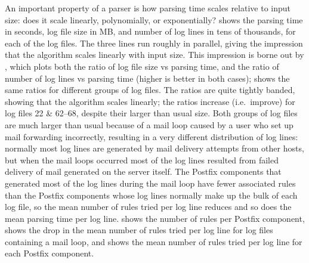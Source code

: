 An important property of a parser is how parsing time scales relative to
input size: does it scale linearly, polynomially, or exponentially?
 shows
the parsing time in seconds, log file size in MB, and number of log lines
in tens of thousands, for each of the \numberOFlogFILES{} log files.  The
three lines run roughly in parallel, giving the impression that the
algorithm scales linearly with input size.  This impression is borne out by
,
which plots both the ratio of log file size vs parsing time, and the ratio
of number of log lines vs parsing time (higher is better in both cases);
 shows the same ratios for different groups of log files.  The ratios
are quite tightly banded, showing that the algorithm scales linearly; the
ratios increase (i.e.\ improve) for log files 22 \& 62--68, despite their
larger than usual size.  Both groups of log files are much larger than
usual because of a mail loop caused by a user who set up mail forwarding
incorrectly, resulting in a very different distribution of log lines:
normally most log lines are generated by mail delivery attempts from other
hosts, but when the mail loops occurred most of the log lines resulted from
failed delivery of mail generated on the server itself.  The Postfix
components that generated most of the log lines during the mail loop have
fewer associated rules than the Postfix components whose log lines normally
make up the bulk of each log file, so the mean number of rules tried per
log line reduces and so does the mean parsing time per log line.
 shows the number of rules
per Postfix component, 
shows the drop in the mean number of rules tried per log line for log files
containing a mail loop, and  shows the mean number of rules tried per
log line for each Postfix component.



